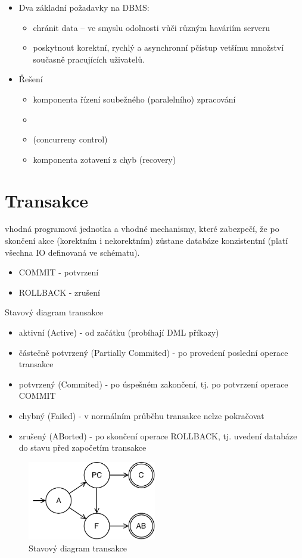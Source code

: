\documentclass{szzclass}
\begin{document}
\begin{itemize}
\item Dva základní požadavky na DBMS:
  \begin{itemize}
  \item chránit data – ve smyslu odolnosti vůči různým haváriím serveru 
  \item poskytnout korektní, rychlý a asynchronní pčístup vetšímu množství současně pracujících uživatelů. 
  \end{itemize}
\item Řešení
  \begin{itemize}
  \item komponenta řízení soubežného (paralelního) zpracování
  \item \item   (concurreny control)
  \item komponenta zotavení z chyb (recovery)
  \end{itemize}
\end{itemize}

\section{Transakce}
vhodná programová jednotka a vhodné mechanismy, které zabezpečí, že po skončení akce (korektním i nekorektním) zůstane databáze konzistentní (platí všechna IO definovaná ve schématu).

\begin{itemize}
\item COMMIT - potvrzení
\item ROLLBACK - zrušení
\end{itemize}

Stavový diagram transakce
\begin{itemize}
\item aktivní (Active) - od začátku (probíhají DML příkazy)
\item částečně potvrzený (Partially Commited) - po provedení poslední operace transakce
\item potvrzený (Commited) - po úspešném zakončení, tj. po potvrzení operace COMMIT
\item chybný (Failed) - v normálním průběhu transakce nelze pokračovat
\item zrušený (ABorted) - po skončení operace ROLLBACK, tj. uvedení databáze do stavu před započetím transakce
\end{itemize}

\begin{figure}[h!]
  \includegraphics[width=0.5\textwidth]{topics/bi-spol-10/images/state}
  \caption{Stavový diagram transakce}
\end{figure}
\end{document}
